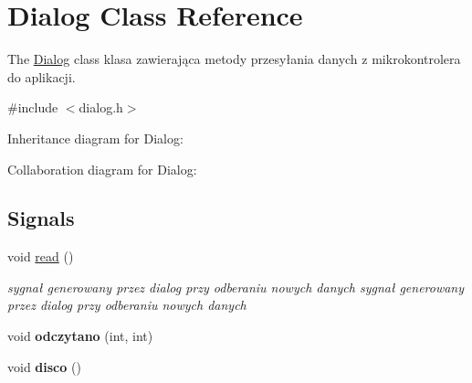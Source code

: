 \hypertarget{classDialog}{}\section{Dialog Class Reference}
\label{classDialog}


The \hyperlink{classDialog}{Dialog} class klasa zawierająca metody przesyłania danych z mikrokontrolera do aplikacji.  




{\ttfamily \#include $<$dialog.\+h$>$}



Inheritance diagram for Dialog\+:


Collaboration diagram for Dialog\+:
\subsection*{Signals}
\begin{DoxyCompactItemize}
\item 
\mbox{\label{classDialog_ad766f1df658ea06808d040a19878f4f9}} 
void \hyperlink{classDialog_ad766f1df658ea06808d040a19878f4f9}{read} ()
\begin{DoxyCompactList}\small\item\em sygnał generowany przez dialog przy odberaniu nowych danych sygnał generowany przez dialog przy odberaniu nowych danych \end{DoxyCompactList}\item 
\mbox{\label{classDialog_aaea69985a8152a31d08a17473e5bbabf}} 
void {\bfseries odczytano} (int, int)
\item 
\mbox{\label{classDialog_a4218d224610ffc2b8d46958ab6d595e9}} 
void {\bfseries disco} ()
\end{DoxyCompactItemize}
